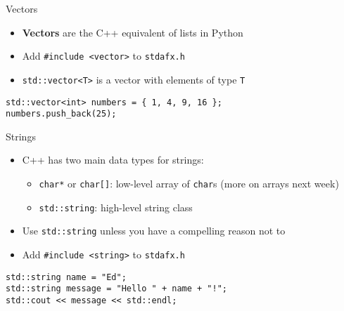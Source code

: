 \begin{frame}[fragile]{Vectors}
	\begin{itemize}
		\item \textbf{Vectors} are the C++ equivalent of lists in Python
		\pause
		\item Add \lstinline{#include <vector>} to \texttt{stdafx.h}
		\pause
		\item \lstinline{std::vector<T>} is a vector with elements of type \lstinline{T}
	\end{itemize}
	\pause
	\begin{lstlisting}
std::vector<int> numbers = { 1, 4, 9, 16 };
numbers.push_back(25);
	\end{lstlisting}
\end{frame}

\begin{frame}[fragile]{Strings}
	\begin{itemize}
		\item C++ has two main data types for strings:
		\begin{itemize}
			\item \lstinline{char*} or \lstinline{char[]}: low-level array of \lstinline{char}s (more on arrays next week)
			\item \lstinline{std::string}: high-level string class
		\end{itemize}
		\pause
		\item Use \lstinline{std::string} unless you have a compelling reason not to
		\pause
		\item Add \lstinline{#include <string>} to \texttt{stdafx.h}
	\end{itemize}
	\pause
	\begin{lstlisting}
std::string name = "Ed";
std::string message = "Hello " + name + "!";
std::cout << message << std::endl;
	\end{lstlisting}
\end{frame}

